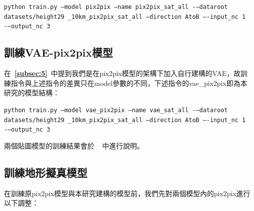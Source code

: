 \documentclass[a4paper, 12pt]{article}
\begin{document}
\begin{center}
    \texttt{\small python train.py --model pix2pix --name pix2pix\_sat\_all -–dataroot datasets/height29 \_10km\_pix2pix\_sat\_all --direction AtoB –-input\_nc 1 -–output\_nc 3}
\end{center}


\subsection{訓練VAE-pix2pix模型}
在~\textbf{\ref{subsec:5}}~中提到我們是在pix2pix模型的架構下加入自行建構的VAE，故訓練指令與上述指令的差異只在model參數的不同，下述指令的vae\_pix2pix即為本研究的模型結構：

\begin{center}
    \texttt{\small python train.py --model vae\_pix2pix --name vae\_sat\_all -–dataroot datasets/height29 \_10km\_pix2pix\_sat\_all --direction AtoB –-input\_nc 1 -–output\_nc 3}
\end{center}

兩個貼圖模型的訓練結果會於\textbf{~~}中進行說明。

\subsection{訓練地形擬真模型}
在訓練原pix2pix模型與本研究建構的模型前，我們先對兩個模型內的pix2pix進行以下調整：
\end{document}
